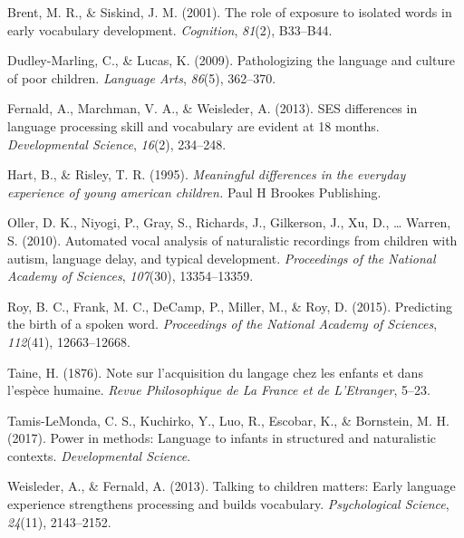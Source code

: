 \documentclass[floatsintext,man]{apa6}
\theoremstyle{definition}
\theoremstyle{definition}
\theoremstyle{definition}
\theoremstyle{remark}
\begin{document}
\hypertarget{ref-brent2001role}{}
Brent, M. R., \& Siskind, J. M. (2001). The role of exposure to isolated
words in early vocabulary development. \emph{Cognition}, \emph{81}(2),
B33--B44.

\hypertarget{ref-dudley2009pathologizing}{}
Dudley-Marling, C., \& Lucas, K. (2009). Pathologizing the language and
culture of poor children. \emph{Language Arts}, \emph{86}(5), 362--370.

\hypertarget{ref-fernald2013ses}{}
Fernald, A., Marchman, V. A., \& Weisleder, A. (2013). SES differences
in language processing skill and vocabulary are evident at 18 months.
\emph{Developmental Science}, \emph{16}(2), 234--248.

\hypertarget{ref-hart1995meaningful}{}
Hart, B., \& Risley, T. R. (1995). \emph{Meaningful differences in the
everyday experience of young american children.} Paul H Brookes
Publishing.

\hypertarget{ref-oller2010automated}{}
Oller, D. K., Niyogi, P., Gray, S., Richards, J., Gilkerson, J., Xu, D.,
\ldots{} Warren, S. (2010). Automated vocal analysis of naturalistic
recordings from children with autism, language delay, and typical
development. \emph{Proceedings of the National Academy of Sciences},
\emph{107}(30), 13354--13359.

\hypertarget{ref-roy2015predicting}{}
Roy, B. C., Frank, M. C., DeCamp, P., Miller, M., \& Roy, D. (2015).
Predicting the birth of a spoken word. \emph{Proceedings of the National
Academy of Sciences}, \emph{112}(41), 12663--12668.

\hypertarget{ref-taine1876note}{}
Taine, H. (1876). Note sur l'acquisition du langage chez les enfants et
dans l'espèce humaine. \emph{Revue Philosophique de La France et de
L'Etranger}, 5--23.

\hypertarget{ref-tamis2017power}{}
Tamis-LeMonda, C. S., Kuchirko, Y., Luo, R., Escobar, K., \& Bornstein,
M. H. (2017). Power in methods: Language to infants in structured and
naturalistic contexts. \emph{Developmental Science}.

\hypertarget{ref-weisleder2013talking}{}
Weisleder, A., \& Fernald, A. (2013). Talking to children matters: Early
language experience strengthens processing and builds vocabulary.
\emph{Psychological Science}, \emph{24}(11), 2143--2152.
\end{document}
